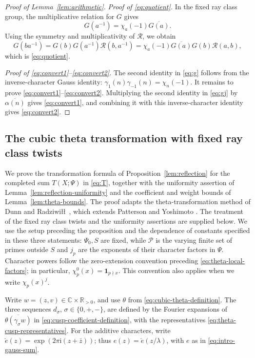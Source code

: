 \documentclass[11pt,a4paper]{article}
\numberwithin{equation}{section}
\numberwithin{figure}{section}
\theoremstyle{definition}
\theoremstyle{remark}
\newcommand{\ind}{\mathbf1}
\begin{document}
\begin{proof}[Proof of Lemma~\ref{lem:arithmetic}]
\par\noindent\textit{Proof of \eqref{eq:quotient}.}\quad
In the fixed ray class group, the multiplicative relation for $G$ gives
\[
 G(a^{-1})=\chi_a(-1)\overline{G(a)}.
\]
Using the symmetry and multiplicativity of $\mathcal R$, we obtain
\[
 G(ba^{-1}) =G(b)G(a^{-1})\mathcal R(b,a^{-1}) =\chi_a(-1)\overline{G(a)}G(b)\mathcal R(a,b),
\]
which is \eqref{eq:quotient}.

\par\noindent\textit{Proof of \eqref{eq:convert1}--\eqref{eq:convert2}.}\quad
The second identity in \eqref{eq:g} follows from the inverse-character
Gauss identity:
$\gamma_1(n)\gamma_{-1}(n)=\chi_n(-1)$.
It remains to prove \eqref{eq:convert1}--\eqref{eq:convert2}.
Multiplying the second identity in \eqref{eq:gj} by
$\overline{\alpha(n)}$ gives \eqref{eq:convert1}, and combining it
with this inverse-character identity gives \eqref{eq:convert2}.
\end{proof}

\subsection{The cubic theta transformation with fixed ray class twists}\label{app:fixed-ray}

We prove the transformation formula of Proposition~\ref{lem:reflection}
for the completed sum $T(X;\Psi)$ in \eqref{eq:T}, together with
the uniformity assertion of Lemma~\ref{lem:reflection-uniformity} and 
the coefficient and weight bounds of Lemma~\ref{lem:theta-bounds}.
The proof adapts the theta-transformation method of Dunn and
Radziwi\l\l\ \cite[\S5 and Appendix~A]{DR}, which extends Patterson
\cite{Pat77} and Yoshimoto \cite{Yos87}. The treatment of the fixed ray
class twists and the uniformity assertions are supplied below.
We use the setup preceding the proposition and the dependence of
constants specified in these three statements: $\Psi_0,S$ are fixed,
while $\mathcal P$ is the varying finite set of primes outside $S$
and $j_p$ are the exponents of their character factors in $\Psi$.
Character powers follow the zero-extension convention preceding
\eqref{eq:theta-local-factors}; in particular,
$\chi_p^0(x)=\ind_{p\nmid x}$. This convention also applies when
we write $\chi_p(x)^j$.

Write $w=(z,v)\in\mathbb C\times\mathbb R_{>0}$, and use $\theta$
from \eqref{eq:cubic-theta-definition}. The three sequences
$d_\sigma$, $\sigma\in\{0,+,-\}$, are defined by the Fourier expansions
of $\overline{\theta(\gamma_\sigma w)}$ in
\eqref{eq:cusp-coefficient-definition}, with the representatives
\eqref{eq:theta-cusp-representatives}.
For the additive characters, write
$\breve e(z)=\exp(2\pi \mathrm i(z+\bar z))$; thus
$e(z)=\breve e(z/\lambda)$, with $e$ as in \eqref{eq:intro-gauss-sum}.
\end{document}
